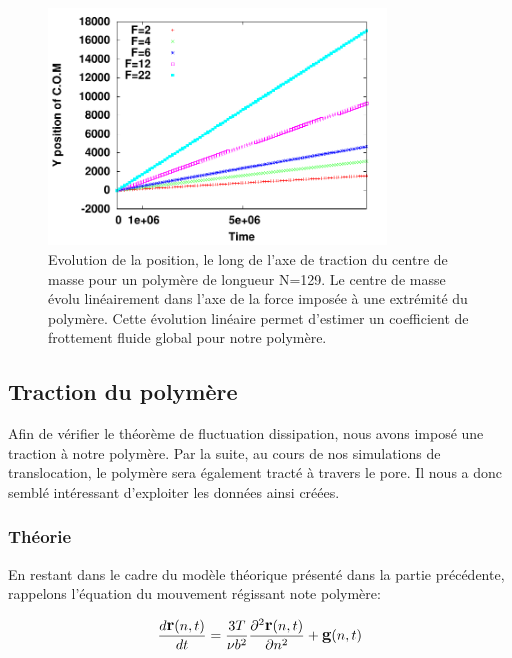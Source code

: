 \begin{figure}[H]
\begin{center}
\includegraphics[width=0.8\textwidth]{traction.pdf}

\caption[Résultats numériques: centre de masse en traction]{Evolution de la position, le long de l'axe de traction du centre de masse pour un polymère de longueur N=129. Le centre de masse évolu linéairement dans l'axe de la force imposée à une extrémité du polymère. Cette évolution linéaire permet d'estimer un coefficient de frottement fluide global pour notre polymère.}
\label{linfrot}
\end{center}
\end{figure}


\subsection{Traction du polymère}

Afin de vérifier le théorème de fluctuation dissipation, nous avons imposé une traction à notre polymère. Par la suite, au cours de nos simulations de translocation, le polymère sera également tracté à travers le pore. Il nous a donc semblé intéressant d'exploiter les données ainsi créées.

\subsubsection{Théorie}

En restant dans le cadre du modèle théorique présenté dans la partie précédente, rappelons l'équation du mouvement régissant note polymère:

\begin{eqnarray}
\large{
\frac{d \textbf{r}(n,t)}{dt} =  \frac{3T}{\nu b^2}\frac{\partial ^2 \textbf{r}(n,t)}{\partial  n^2} + \textbf{g}(n,t)}
\end{eqnarray}

